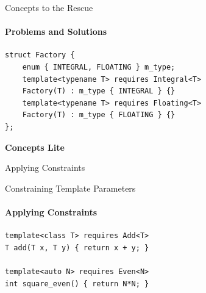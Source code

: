 \documentclass{beamer}
\begin{document}
    \begin{frame}[fragile]{Concepts to the Rescue}
        \framesubtitle{Problems and Solutions}
        \begin{center}
        \begin{lstlisting}[caption={overloading based on constraint with the \texttt{requires} clause.}]
struct Factory {
    enum { INTEGRAL, FLOATING } m_type;
    template<typename T> requires Integral<T>
    Factory(T) : m_type { INTEGRAL } {}
    template<typename T> requires Floating<T>
    Factory(T) : m_type { FLOATING } {}
}; \end{lstlisting}
        \end{center}
    \end{frame}

    \begin{frame}[fragile]{\textbf{Concepts Lite}}
    \end{frame}

    \begin{frame}[fragile]{Applying Constraints}
    \end{frame}

    \begin{frame}[fragile]{Constraining Template Parameters}
        \framesubtitle{Applying Constraints}
        \begin{center}
        \begin{lstlisting}[caption={...}]
template<class T> requires Add<T>
T add(T x, T y) { return x + y; }

template<auto N> requires Even<N>
int square_even() { return N*N; } \end{lstlisting}
        \end{center}
    \end{frame}
\end{document}
